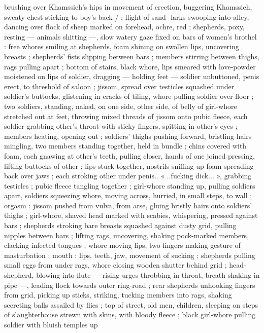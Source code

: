 brushing over Khamssieh's hips in movement of erection, buggering
Khamssieh, sweaty chest sticking to boy's back / ; flight of sand-
larks swooping into alley, dancing over flock of sheep marked on %
forehead, ochre, red ; shepherds, poxy, resting --- animals shitting
---, slow watery gaze fixed on bars of women's brothel : free whores
smiling at shepherds, foam shining on swollen lips, uncovering
breasts ; shepherds’ fists slipping between bars ; members stirring
between thighs, rags pulling apart ; bottom of stairs, black whore,
lips smeared with love-powder moistened on lips of soldier, dragging
--- holding feet --- soldier unbuttoned, penis erect, to threshold of
saloon ; jissom, spread over testicles squashed under soldier's
buttocks, glistening in cracks of tiling, whore pulling soldier over
floor ; two soldiers, standing, naked, on one side, other side, of belly
of girl-whore stretched out at feet, throwing mixed threads of jissom
onto pubic fleece, each soldier grabbing other's throat with sticky
fingers, spitting in other's eyes ; members heating, opening out ;
soldiers’ thighs pushing forward, bristling hairs mingling, two
members standing together, held in bundle ; chins covered with
foam, each gnawing at other's teeth, pulling closer, hands of one
joined pressing, lifting buttocks of other ; lips stuck together, nostrils
sniffing up foam spreading back over jaws ; each stroking other
under penis.. « ..fucking dick... », grabbing testicles ; pubic fleece
tangling together ; girl-whore standing up, pulling soldiers apart,
soldiers squeezing whore, moving across, hurried, in small steps, to
wall ; orgasm : jissom pushed from vulva, from arse, gluing bristly
hairs onto soldiers’ thighs ; girl-whore, shaved head marked with
scabies, whispering, pressed against bars ; shepherds stroking bare
breasts squashed against dusty grid, pulling nipples between bars ;
lifting rags, uncovering, shaking pock-marked members, clacking
infected tongues ; whore moving lips, two fingers making gesture of
masturbation ; mouth : lips, teeth, jaw, movement of sucking ;
shepherds pulling small eggs from under rags, whore closing
wooden shutter behind grid ; head-shepherd, blowing into flute ---
rising urges throbbing in throat, breath shaking in pipe ---, leading
flock towards outer ring-road ; rear shepherds unhooking fingers
from grid, picking up sticks, striking, tucking members into rags,
shaking secreting balls assailed by flies ; top of street, old men, %
children, sleeping on steps of slaughterhouse strewn with skins, with
bloody fleece ; black girl-whore pulling soldier with bluish temples up
